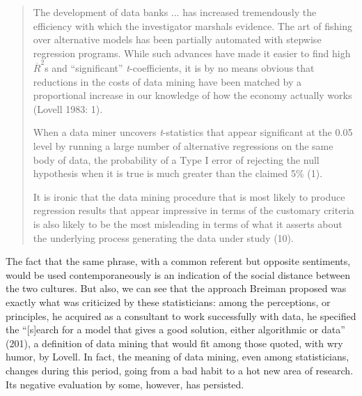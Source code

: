 \documentclass[
  letterpaper,
]{report}
\begin{document}
\begin{quote}
The development of data banks ... has increased tremendously the
efficiency with which the investigator marshals evidence. The art of
fishing over alternative models has been partially automated with
stepwise regression programs. While such advances have made it easier to
find high \(\overline{R}^ 2\)s and ``significant''
\emph{t}-coefficients, it is by no means obvious that reductions in the
costs of data mining have been matched by a proportional increase in our
knowledge of how the economy actually works (Lovell 1983: 1).

When a data miner uncovers \emph{t}-statistics that appear significant
at the 0.05 level by running a large number of alternative regressions
on the same body of data, the probability of a Type I error of rejecting
the null hypothesis when it is true is much greater than the claimed 5\%
(1).

It is ironic that the data mining procedure that is most likely to
produce regression results that appear impressive in terms of the
customary criteria is also likely to be the most misleading in terms of
what it asserts about the underlying process generating the data under
study (10).
\end{quote}

The fact that the same phrase, with a common referent but opposite
sentiments, would be used contemporaneously is an indication of the
social distance between the two cultures. But also, we can see that the
approach Breiman proposed was exactly what was criticized by these
statisticians: among the perceptions, or principles, he acquired as a
consultant to work successfully with data, he specified the
``{[}s{]}earch for a model that gives a good solution, either
algorithmic or data'' (201), a definition of data mining that would fit
among those quoted, with wry humor, by Lovell. In fact, the meaning of
data mining, even among statisticians, changes during this period, going
from a bad habit to a hot new area of research. Its negative evaluation
by some, however, has persisted.
\end{document}
